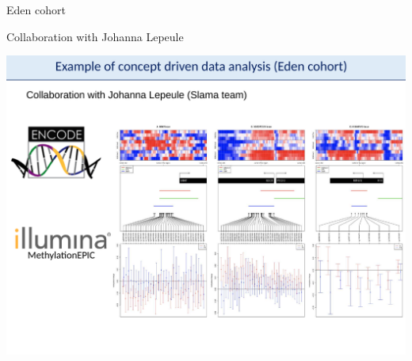 \documentclass[final]{beamer}
\newlength{\twocolwid}
\begin{document}
\begin{frame}[t]
\begin{columns}[t]
\begin{column}{\twocolwid}
\begin{block}{Eden cohort}
{

Collaboration with Johanna Lepeule

\centering
\mbox{\includegraphics[trim = 0mm 0mm 0mm 43mm, clip, width=.66\linewidth]{figs/fig07}}

}
\end{block}






\end{column}
\end{columns}
\end{frame}
\end{document}
